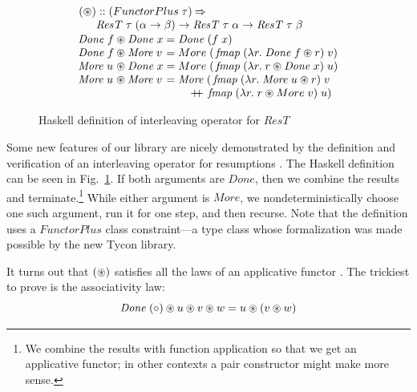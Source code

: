 \documentclass{sigplanconf}
\newcommand{\hsapp}{\mathbin{+\mkern-7mu+}}
\newcommand{\To}{\mathbin{\Rightarrow}}
\newcommand{\hair}{\mskip1mu}
\newcommand{\hsc}[1]{\ensuremath{\mathit{#1}}}
\newcommand{\fmap}{\,\hsc{fmap}} %
\newcommand{\tA}{\alpha}
\newcommand{\tB}{\beta}
\newcommand{\tT}{\tau}
\theoremstyle{definition}
\begin{document}
\begin{figure}
\begin{align*}
  & \hair(\apRT) :: (FunctorPlus\;\tT) \To {} \\[-\jot]
  & \hspace{16pt}
  \hsc{ResT}\;\tT\;(\tA\to\tB) \to \hsc{ResT}\;\tT\;\tA \to \hsc{ResT}\;\tT\;\tB
  \\[-\jot]
  &
  \begin{alignedat}{3}
    & \hsc{Done}\;f &&\apRT \hsc{Done}\;x &&= \hsc{Done}\;(f\;x)
    \\[-\jot]
    & \hsc{Done}\;f &&\apRT \hsc{More}\;v &&=
    More\;(\fmap\;(\lambda{r}.\;\hsc{Done}\;f \apRT r)\;v)
    \\[-\jot]
    & \hsc{More}\;u &&\apRT \hsc{Done}\;x &&=
    More\;(\fmap\;(\lambda{r}.\;r \apRT \hsc{Done}\;x)\;u)
    \\[-\jot]
    & \hsc{More}\;u &&\apRT \hsc{More}\;v &&=
    \hsc{More}\;(\fmap\;(\lambda{r}.\; \hsc{More}\;u \apRT r)\;v
    \\[-\jot]
    &&&&& \hspace{22pt} {} \hsapp \fmap\;(\lambda{r}.\;r \apRT More\;v)\;u)
  \end{alignedat}
\end{align*}
\caption{Haskell definition of interleaving operator for \hsc{ResT}}
\label{fig:interleave}
\end{figure}

Some new features of our library are nicely demonstrated by the definition and verification of an interleaving operator for resumptions \cite{Papaspyrou2001}. The Haskell definition can be seen in Fig.~\ref{fig:interleave}. If both arguments are \hsc{Done}, then we combine the results and terminate.\footnote{We combine the results with function application so that we get an applicative functor; in other contexts a pair constructor might make more sense.} While either argument is \hsc{More}, we nondeterministically choose one such argument, run it for one step, and then recurse. Note that the definition uses a \hsc{FunctorPlus} class constraint---a type class whose formalization was made possible by the new Tycon library.

It turns out that $(\mathbin{\circledast})$ satisfies all the laws of an applicative functor \cite{McBride2008}. The trickiest to prove is the associativity law:
%
\begin{equation}
  \hsc{Done}\;(\circ) \apRT u \apRT v \apRT w = u \apRT (v \apRT w)
\end{equation}
\end{document}
